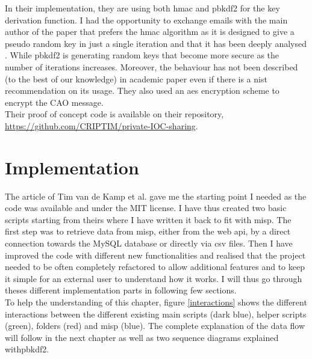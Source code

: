 \documentclass{eplmastersthesis}
\begin{document}
In their implementation, they are using both \gls{hmac} and \gls{pbkdf2} for the key derivation function. I had the opportunity to exchange emails with the main author of the paper that prefers the \gls{hmac} algorithm as it is designed to give a pseudo random key in just a single iteration and that it has been deeply analysed \cite{cryptoeprint}. While \gls{pbkdf2} is generating random keys that become more secure as the number of iterations increases. Moreover, the behaviour has not been described (to the best of our knowledge) in academic paper even if there is a \gls{nist} recommendation on its usage.
They also used an \gls{aes} encryption scheme to encrypt the CAO message.\\

Their proof of concept code is available on their repository, \url{https://github.com/CRIPTIM/private-IOC-sharing}. 




\chapter{Implementation}
\label{chap:Implementation}

The article of Tim van de Kamp et al. gave me the starting point I needed as the code was available and under the MIT license. I have thus created two basic scripts starting from theirs where I have written it back to fit with \gls{misp}.
The first step was to retrieve data from \gls{misp}, either from the web \gls{api}, by a direct connection towards the MySQL database or directly via \gls{csv} files.
Then I have improved the code with different new functionalities and realised that the project needed to be often completely refactored to allow additional features and to keep it simple for an external user to understand how it works. I will thus go through theses different implementation parts in following few sections.\\

To help the understanding of this chapter, figure \ref{interactions} shows the different interactions between the different existing main scripts (dark blue), helper scripts (green), folders (red) and \gls{misp} (blue). The complete explanation of the data flow will follow in the next chapter as well as two sequence diagrams explained with\gls{pbkdf2}. 
\end{document}
